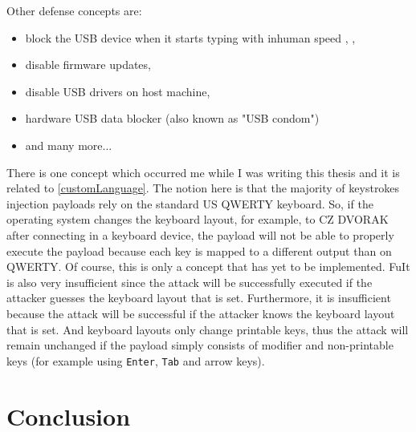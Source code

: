 Other defense concepts are:
\begin{itemize}
    \item block the USB device when it starts typing with inhuman speed \cite{KerschbaumFlorian2018UBUK}, \cite{arghire_2020},
    \item disable firmware updates,
    \item disable USB drivers on host machine,
    \item hardware USB data blocker (also known as "USB condom")\cite{al-sibai_2023}
    \item and many more...
\end{itemize}
There is one concept which occurred me while I was writing this thesis and it is related to \autoref{customLanguage}. The notion here is that the majority of keystrokes injection payloads rely on the standard US QWERTY keyboard. So, if the operating system changes the keyboard layout, for example, to CZ DVORAK after connecting in a keyboard device, the payload will not be able to properly execute the payload because each key is mapped to a different output than on QWERTY. Of course, this is only a concept that has yet to be implemented. FuIt is also very insufficient since the attack will be successfully executed if the attacker guesses the keyboard layout that is set. Furthermore, it is insufficient because the attack will be successful if the attacker knows the keyboard layout that is set. And keyboard layouts only change printable keys, thus the attack will remain unchanged if the payload simply consists of modifier and non-printable keys (for example using \verb|Enter|, \verb|Tab| and arrow keys).

\chapter{Conclusion}
\label{conclusion}

